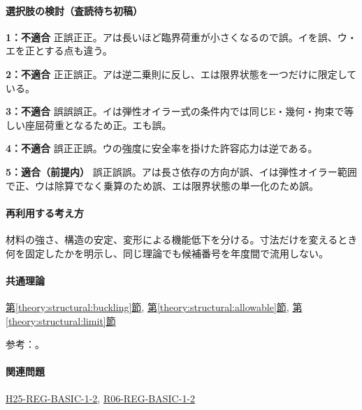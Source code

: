 \paragraph{選択肢の検討（査読待ち初稿）}\mbox{}\par

\noindent\textbf{1：不適合} 正誤正正。アは長いほど臨界荷重が小さくなるので誤。イを誤、ウ・エを正とする点も違う。\par

\noindent\textbf{2：不適合} 正正誤正。アは逆二乗則に反し、エは限界状態を一つだけに限定している。\par

\noindent\textbf{3：不適合} 誤誤誤正。イは弾性オイラー式の条件内では同じE・幾何・拘束で等しい座屈荷重となるため正。エも誤。\par

\noindent\textbf{4：不適合} 誤正正誤。ウの強度に安全率を掛けた許容応力は逆である。\par

\noindent\textbf{5：適合（前提内）} 誤正誤誤。アは長さ依存の方向が誤、イは弾性オイラー範囲で正、ウは除算でなく乗算のため誤、エは限界状態の単一化のため誤。\par

\paragraph{再利用する考え方} 材料の強さ、構造の安定、変形による機能低下を分ける。寸法だけを変えるとき何を固定したかを明示し、同じ理論でも候補番号を年度間で流用しない。

\paragraph{共通理論} \hyperref[theory:structural:buckling]{第\ref*{theory:structural:buckling}節}, \hyperref[theory:structural:allowable]{第\ref*{theory:structural:allowable}節}, \hyperref[theory:structural:limit]{第\ref*{theory:structural:limit}節}

\par 参考：\cite{struct_mit_beam,struct_mit_buckling,struct_mlit_limit}。

\paragraph{関連問題} \hyperref[q:h25-reg-basic-1-2]{H25-REG-BASIC-1-2}, \hyperref[q:r06-reg-basic-1-2]{R06-REG-BASIC-1-2}

